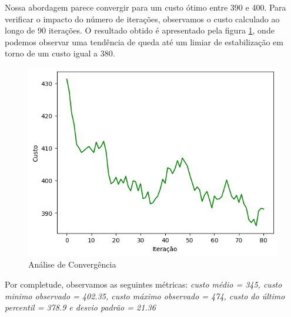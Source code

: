 \documentclass[12pt]{article}
\begin{document}
Nossa abordagem parece convergir para um custo ótimo entre 390 e 400. 
Para verificar o impacto do número de iterações, observamos o custo calculado ao longo de 90 iterações. O resultado obtido é apresentado pela figura \ref{convergencia}, onde podemos observar uma tendência de queda até um limiar de estabilização em torno de um custo igual a 380.
\begin{figure}[h!]
    \centering
    \includegraphics[width= 0.4\linewidth]{imgs/convergencia.png}
    \caption{Análise de Convergência}
    \label{convergencia}
\end{figure}
\newpage
Por completude, observamos as seguintes métricas: \textit{custo médio = 345, custo minimo observado = 402.35, custo máximo observado = 474, custo do último percentil = 378.9 e desvio padrão = 21.36 }
\end{document}
